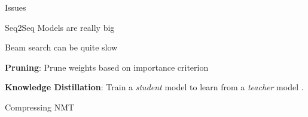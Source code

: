 \documentclass{beamer}
\let\tempone\itemize
\let\temptwo\enditemize
\renewenvironment{itemize}{\tempone\addtolength{\itemsep}{0.5\baselineskip}}{\temptwo}
\newcommand{\air}{\vspace{0.25cm}}
\newcommand{\given}{\,|\,}
\newcommand{\xvec}{\mathbf{x}}
\newcommand{\yvec}{\mathbf{y}}
\newcommand{\Cite}[1]{{\footnotesize \citep{#1}}}
\begin{document}
\begin{frame}

  \centerline{\alert{Issues}}

  \begin{itemize}
  \item Seq2Seq Models are really big %
  \item Beam search can be quite slow
  \end{itemize}

  \centerline{}
\air

\begin{itemize}
\item \textbf{Pruning}: Prune weights based on importance criterion 
\Cite{LeCun1990,Han2016}
\item \textbf{Knowledge Distillation}: Train a \textit{student} model to learn 
from a \textit{teacher} model \Cite{Bucila2006,Ba2014,Hinton2015}.
\end{itemize}
\air
\begin{itemize}
\item Compressing NMT \Cite{See2016}
\end{itemize}
\end{frame}




\end{document}
